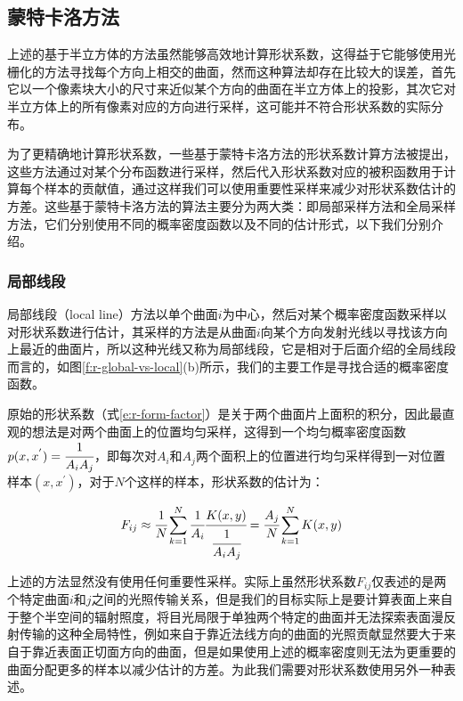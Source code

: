 \subsection{蒙特卡洛方法}\label{sec:r-mc-radiosity}
上述的基于半立方体的方法虽然能够高效地计算形状系数，这得益于它能够使用光栅化的方法寻找每个方向上相交的曲面，然而这种算法却存在比较大的误差，首先它以一个像素块大小的尺寸来近似某个方向的曲面在半立方体上的投影，其次它对半立方体上的所有像素对应的方向进行采样，这可能并不符合形状系数的实际分布。

为了更精确地计算形状系数，一些基于蒙特卡洛方法的形状系数计算方法被提出，这些方法通过对某个分布函数进行采样，然后代入形状系数对应的被积函数用于计算每个样本的贡献值，通过这样我们可以使用重要性采样来减少对形状系数估计的方差。这些基于蒙特卡洛方法的算法主要分为两大类：即局部采样方法和全局采样方法，它们分别使用不同的概率密度函数以及不同的估计形式，以下我们分别介绍。





\subsubsection{局部线段}
局部线段（local line）方法\cite{a:AGeneralTwoPassMethodIntegratingSpecularandDiffuseReflection,a:ARayTracingMethodforIlluminationCalculationinDiffuse-SpecularScenes}以单个曲面$i$为中心，然后对某个概率密度函数采样以对形状系数进行估计，其采样的方法是从曲面$i$向某个方向发射光线以寻找该方向上最近的曲面片，所以这种光线又称为局部线段，它是相对于后面介绍的全局线段而言的，如图\ref{f:r-global-vs-local}(b)所示，我们的主要工作是寻找合适的概率密度函数。

原始的形状系数（式\ref{e:r-form-factor}）是关于两个曲面片上面积的积分，因此最直观的想法是对两个曲面上的位置均匀采样，这得到一个均匀概率密度函数$p(x,x^{'})= \cfrac{1}{A_iA_j}$，即每次对$A_i$和$A_j$两个面积上的位置进行均匀采样得到一对位置样本$(x,x^{'})$，对于$N$个这样的样本，形状系数的估计为：

\begin{equation}
	F_{ij}\approx \cfrac{1}{N}\sum^{N}_{k=1} \cfrac{1}{A_i} \cfrac{K(x,y)}{ \cfrac{1}{A_iA_j}}= \cfrac{A_j}{N}\sum^{N}_{k=1}K(x,y)
\end{equation}

\noindent 上述的方法显然没有使用任何重要性采样。实际上虽然形状系数$F_{ij}$仅表述的是两个特定曲面$i$和$j$之间的光照传输关系，但是我们的目标实际上是要计算表面上来自于整个半空间的辐射照度，将目光局限于单独两个特定的曲面并无法探索表面漫反射传输的这种全局特性，例如来自于靠近法线方向的曲面的光照贡献显然要大于来自于靠近表面正切面方向的曲面，但是如果使用上述的概率密度则无法为更重要的曲面分配更多的样本以减少估计的方差。为此我们需要对形状系数使用另外一种表述。

